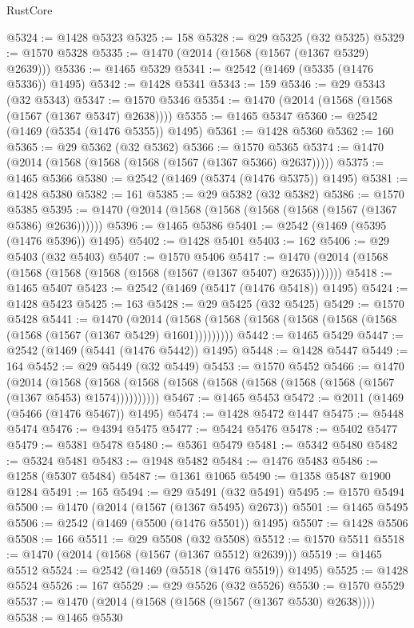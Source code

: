 \begin{lexlean}{RustCore}
\begin{coremodule}
@5324 := @1428 @5323
@5325 := 158
@5328 := @29 @5325 (@32 @5325)
@5329 := @1570 @5328
@5335 := @1470 (@2014 (@1568 (@1567 (@1367 @5329) @2639)))
@5336 := @1465 @5329
@5341 := @2542 (@1469 (@5335 (@1476 @5336)) @1495)
@5342 := @1428 @5341
@5343 := 159
@5346 := @29 @5343 (@32 @5343)
@5347 := @1570 @5346
@5354 := @1470 (@2014 (@1568 (@1568 (@1567 (@1367 @5347) @2638))))
@5355 := @1465 @5347
@5360 := @2542 (@1469 (@5354 (@1476 @5355)) @1495)
@5361 := @1428 @5360
@5362 := 160
@5365 := @29 @5362 (@32 @5362)
@5366 := @1570 @5365
@5374 := @1470 (@2014 (@1568 (@1568 (@1568 (@1567 (@1367 @5366) @2637)))))
@5375 := @1465 @5366
@5380 := @2542 (@1469 (@5374 (@1476 @5375)) @1495)
@5381 := @1428 @5380
@5382 := 161
@5385 := @29 @5382 (@32 @5382)
@5386 := @1570 @5385
@5395 := @1470 (@2014 (@1568 (@1568 (@1568 (@1568 (@1567 (@1367 @5386) @2636))))))
@5396 := @1465 @5386
@5401 := @2542 (@1469 (@5395 (@1476 @5396)) @1495)
@5402 := @1428 @5401
@5403 := 162
@5406 := @29 @5403 (@32 @5403)
@5407 := @1570 @5406
@5417 := @1470 (@2014 (@1568 (@1568 (@1568 (@1568 (@1568 (@1567 (@1367 @5407) @2635)))))))
@5418 := @1465 @5407
@5423 := @2542 (@1469 (@5417 (@1476 @5418)) @1495)
@5424 := @1428 @5423
@5425 := 163
@5428 := @29 @5425 (@32 @5425)
@5429 := @1570 @5428
@5441 := @1470
    (@2014 (@1568 (@1568 (@1568 (@1568 (@1568 (@1568 (@1568 (@1567 (@1367 @5429) @1601)))))))))
@5442 := @1465 @5429
@5447 := @2542 (@1469 (@5441 (@1476 @5442)) @1495)
@5448 := @1428 @5447
@5449 := 164
@5452 := @29 @5449 (@32 @5449)
@5453 := @1570 @5452
@5466 := @1470
    (@2014
      (@1568 (@1568 (@1568 (@1568 (@1568 (@1568 (@1568 (@1568 (@1567 (@1367 @5453) @1574))))))))))
@5467 := @1465 @5453
@5472 := @2011 (@1469 (@5466 (@1476 @5467)) @1495)
@5474 := @1428 @5472 @1447
@5475 := @5448 @5474
@5476 := @4394 @5475
@5477 := @5424 @5476
@5478 := @5402 @5477
@5479 := @5381 @5478
@5480 := @5361 @5479
@5481 := @5342 @5480
@5482 := @5324 @5481
@5483 := @1948 @5482
@5484 := @1476 @5483
@5486 := @1258 (@5307 @5484)
@5487 := @1361 @1065
@5490 := @1358 @5487 @1900 @1284
@5491 := 165
@5494 := @29 @5491 (@32 @5491)
@5495 := @1570 @5494
@5500 := @1470 (@2014 (@1567 (@1367 @5495) @2673))
@5501 := @1465 @5495
@5506 := @2542 (@1469 (@5500 (@1476 @5501)) @1495)
@5507 := @1428 @5506
@5508 := 166
@5511 := @29 @5508 (@32 @5508)
@5512 := @1570 @5511
@5518 := @1470 (@2014 (@1568 (@1567 (@1367 @5512) @2639)))
@5519 := @1465 @5512
@5524 := @2542 (@1469 (@5518 (@1476 @5519)) @1495)
@5525 := @1428 @5524
@5526 := 167
@5529 := @29 @5526 (@32 @5526)
@5530 := @1570 @5529
@5537 := @1470 (@2014 (@1568 (@1568 (@1567 (@1367 @5530) @2638))))
@5538 := @1465 @5530

\end{coremodule}
\end{lexlean}
